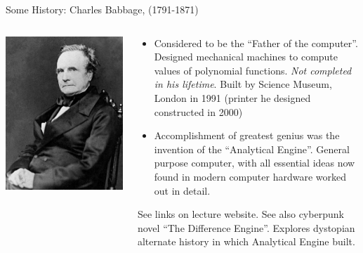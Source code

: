 \documentclass[aspectratio=169]{beamer}
\newcommand{\mypause}{\pause}
\newcommand{\cramplist}{
	\setlength{\itemsep}{0in}
	\setlength{\partopsep}{0in}
	\setlength{\topsep}{0in}}
\begin{document}
\begin{frame}{Some History: Charles Babbage, (1791-1871)}
  \begin{columns}
    
    \begin{column}{0.4\linewidth}
      \includegraphics[width=\linewidth]{Charles_Babbage-1860.jpg}
    \end{column}

    \begin{column}{0.6\linewidth}
      \begin{itemize}\cramplist
      \item Considered to be the ``Father of the computer''. Designed
        mechanical machines to compute values of polynomial
        functions. \emph{Not completed in his lifetime}. Built by
        Science Museum, London in 1991 (printer he designed
        constructed in 2000)
        \mypause%
      \item Accomplishment of greatest genius was the invention of the
        ``Analytical Engine''. General purpose computer, with all
        essential ideas now found in modern computer hardware worked
        out in detail.
      \end{itemize}
      See links on lecture website. See also cyberpunk novel ``The
      Difference Engine''. Explores dystopian alternate history in
      which Analytical Engine built.
    \end{column}
  \end{columns}
\end{frame}
\end{document}
